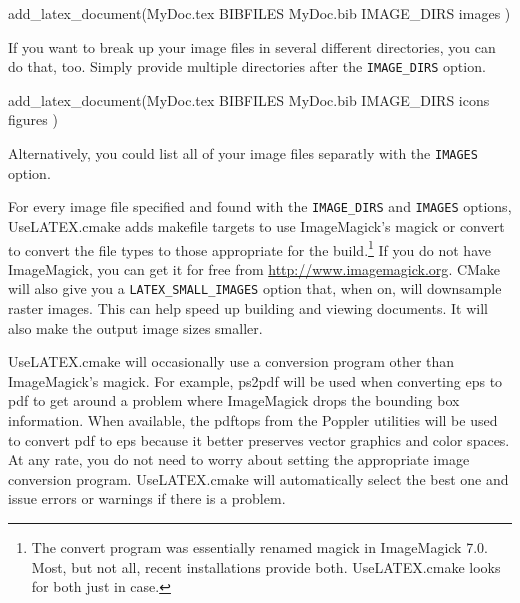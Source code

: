 \documentclass{article}
\newcommand*{\textfile}[1]{\textsf{#1}}
\newcommand*{\textprog}[1]{\textfile{#1}}
\newcommand*{\textcmake}[1]{\texttt{#1}}
\newcommand*{\textcmakevar}[1]{\textcmake{#1}}
\newcommand*{\UseLATEX}{\textfile{UseLATEX.cmake}\xspace}
\begin{document}
  \begin{CodeListing}
add_latex_document(MyDoc.tex
  BIBFILES MyDoc.bib
  IMAGE_DIRS images
  )
  \end{CodeListing}

  If you want to break up your image files in several different
  directories, you can do that, too. Simply provide multiple directories
  after the \textcmake{IMAGE\_DIRS} option.

  \begin{CodeListing}
add_latex_document(MyDoc.tex
  BIBFILES MyDoc.bib
  IMAGE_DIRS icons figures
  )
  \end{CodeListing}

  Alternatively, you could list all of your image files separatly with the
  \textcmake{IMAGES} option.


  For every image file specified and found with the \textcmake{IMAGE\_DIRS} and \textcmake{IMAGES} options, \UseLATEX adds makefile targets to use ImageMagick's \textprog{magick} or \textprog{convert} to convert the file types to those appropriate for the build.\footnote{The \textprog{convert} program was essentially renamed \textprog{magick} in ImageMagick 7.0. Most, but not all, recent installations provide both. \UseLATEX looks for both just in case.}
  If you do not have ImageMagick, you can get it for free from \href{http://www.imagemagick.org}{http://www.imagemagick.org}.
  CMake will also give you a \textcmakevar{LATEX\_SMALL\_IMAGES} option that, when on, will downsample raster images.
  This can help speed up building and viewing documents.
  It will also make the output image sizes smaller.

  \UseLATEX will occasionally use a conversion program other than
  ImageMagick's \textprog{magick}.  For example, \textprog{ps2pdf} will be
  used when converting eps to pdf to get around a problem where ImageMagick
  drops the bounding box information.  When available, the
  \textprog{pdftops} from the Poppler utilities will be used to convert pdf
  to eps because it better preserves vector graphics and color spaces.  At
  any rate, you do not need to worry about setting the appropriate image
  conversion program.  \UseLATEX will automatically select the best one and
  issue errors or warnings if there is a problem.
\end{document}

